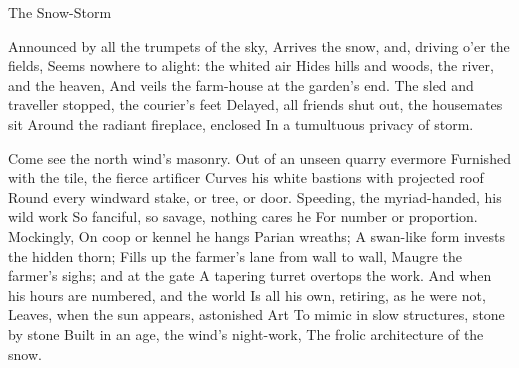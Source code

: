 The Snow-Storm

Announced by all the trumpets of the sky,
Arrives the snow, and, driving o'er the fields,
Seems nowhere to alight: the whited air
Hides hills and woods, the river, and the heaven,
And veils the farm-house at the garden's end.
The sled and traveller stopped, the courier's feet
Delayed, all friends shut out, the housemates sit
Around the radiant fireplace, enclosed
In a tumultuous privacy of storm.

Come see the north wind's masonry.
Out of an unseen quarry evermore
Furnished with the tile, the fierce artificer
Curves his white bastions with projected roof
Round every windward stake, or tree, or door.
Speeding, the myriad-handed, his wild work
So fanciful, so savage, nothing cares he
For number or proportion. Mockingly,
On coop or kennel he hangs Parian wreaths;
A swan-like form invests the hidden thorn;
Fills up the farmer's lane from wall to wall,
Maugre the farmer's sighs; and at the gate
A tapering turret overtops the work.
And when his hours are numbered, and the world
Is all his own, retiring, as he were not,
Leaves, when the sun appears, astonished Art
To mimic in slow structures, stone by stone
Built in an age, the wind's night-work,
The frolic architecture of the snow.

